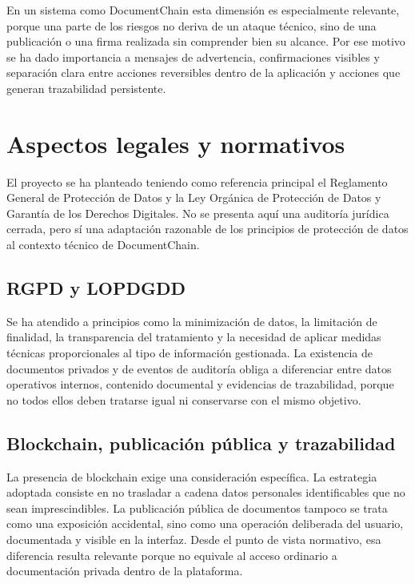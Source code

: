 \documentclass[11pt, a4paper]{article}
\begin{document}
En un sistema como DocumentChain esta dimensión es especialmente relevante, porque una parte de los riesgos no deriva de un ataque técnico, sino de una publicación o una firma realizada sin comprender bien su alcance. Por ese motivo se ha dado importancia a mensajes de advertencia, confirmaciones visibles y separación clara entre acciones reversibles dentro de la aplicación y acciones que generan trazabilidad persistente.

\section{Aspectos legales y normativos}

El proyecto se ha planteado teniendo como referencia principal el Reglamento General de Protección de Datos y la Ley Orgánica de Protección de Datos y Garantía de los Derechos Digitales. No se presenta aquí una auditoría jurídica cerrada, pero sí una adaptación razonable de los principios de protección de datos al contexto técnico de DocumentChain.

\subsection{RGPD y LOPDGDD}

Se ha atendido a principios como la minimización de datos, la limitación de finalidad, la transparencia del tratamiento y la necesidad de aplicar medidas técnicas proporcionales al tipo de información gestionada. La existencia de documentos privados y de eventos de auditoría obliga a diferenciar entre datos operativos internos, contenido documental y evidencias de trazabilidad, porque no todos ellos deben tratarse igual ni conservarse con el mismo objetivo.

\subsection{Blockchain, publicación pública y trazabilidad}

La presencia de blockchain exige una consideración específica. La estrategia adoptada consiste en no trasladar a cadena datos personales identificables que no sean imprescindibles. La publicación pública de documentos tampoco se trata como una exposición accidental, sino como una operación deliberada del usuario, documentada y visible en la interfaz. Desde el punto de vista normativo, esa diferencia resulta relevante porque no equivale al acceso ordinario a documentación privada dentro de la plataforma.
\end{document}
